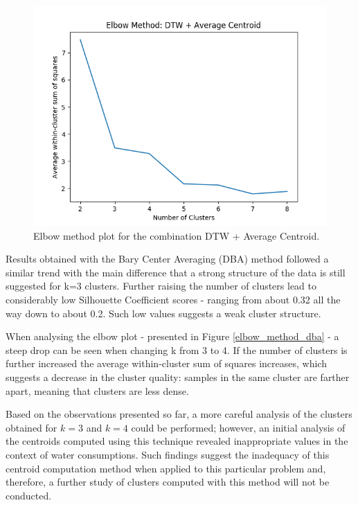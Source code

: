 \documentclass[9pt,journal,compsoc]{IEEEtran}
\begin{document}
\begin{figure}[ht]
	\centering
	\includegraphics[scale=0.5]{images/raw_dtw_Average.png}
	\caption{Elbow method plot for the combination DTW + Average Centroid.}
	\label{elbow_method_euclidean}
\end{figure}

Results obtained with the Bary Center Averaging (DBA) method followed a similar trend with the main difference that a strong structure of the data is still suggested for k=3 clusters. Further raising the number of clusters lead to considerably low Silhouette Coefficient scores - ranging from about 0.32 all the way down to about 0.2. Such low values suggests a weak cluster structure.

When analysing the elbow plot - presented in Figure \ref{elbow_method_dba} - a steep drop can be seen when changing k from 3 to 4. If the number of clusters is further increased the average within-cluster sum of squares increases, which suggests a decrease in the cluster quality: samples in the same cluster are farther apart, meaning that clusters are less dense.

Based on the observations presented so far, a more careful analysis of the clusters obtained for $k = 3$ and $k = 4$ could be performed; however, an initial analysis of the centroids computed using this technique revealed inappropriate values in the context of water consumptions. Such findings suggest the inadequacy of this centroid computation method when applied to this particular problem and, therefore, a further study of clusters computed with this method will not be conducted.
\end{document}
